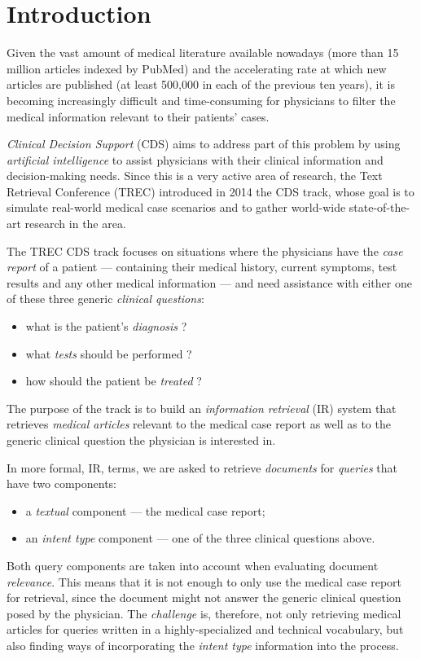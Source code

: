 \chapter{Introduction}
Given the vast amount of medical literature available nowadays (more than 15 million articles indexed by PubMed)
and the accelerating rate at which new articles are published (at least 500,000 in each of the previous ten years),
it is becoming increasingly difficult and time-consuming for physicians to filter the medical information
relevant to their patients' cases.

\emph{Clinical Decision Support} (CDS) aims to address part of this problem by using \emph{artificial intelligence}
to assist physicians with their clinical information and decision-making needs.
Since this is a very active area of research,
the Text Retrieval Conference (TREC)
introduced in 2014 the CDS track,
whose goal is to simulate real-world medical case scenarios and to gather world-wide state-of-the-art research in the area.

The TREC CDS track focuses on situations where the physicians have the \emph{case report} of a patient
--- containing their medical history, current symptoms, test results and any other medical information ---
and need assistance with either one of these three generic
\emph{clinical questions}:
\begin{itemize}[noitemsep,nolistsep]
 \item what is the patient's \emph{diagnosis} ?
 \item what \emph{tests} should be performed ?
 \item how should the patient be \emph{treated} ?\end{itemize}

The purpose of the track is to build an \emph{information retrieval} (IR) system that
retrieves \emph{medical articles} relevant to the medical
case report as well as to the generic clinical question the physician is interested in.

In more formal, IR, terms, we are asked to retrieve \emph{documents} for \emph{queries} that have two components:
\begin{itemize}[noitemsep, nolistsep]
 \item a \emph{textual} component --- the medical case report;
 \item an \emph{intent type} component --- one of the three clinical questions above.
\end{itemize}

Both query components are taken into account when evaluating document \emph{relevance}.
This means that it is not enough to only use the medical case report
for retrieval, since the document might not answer the generic clinical question posed by the physician.
The \emph{challenge} is, therefore, not only retrieving medical articles for queries written in a highly-specialized and technical
vocabulary, but also finding ways of incorporating the \emph{intent type} information into the process.

